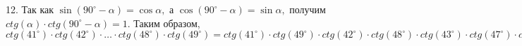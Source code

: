 12. Так как $\sin (90^\circ-\alpha)=\cos \alpha,$ а $\cos (90^\circ-\alpha)=\sin \alpha,$ получим $ctg(\alpha)\cdot ctg(90^\circ-\alpha)=1.$ Таким образом,
$ctg(41^\circ)\cdot ctg(42^\circ)\cdot \ldots \cdot ctg(48^\circ)\cdot ctg(49^\circ)=ctg(41^\circ)\cdot ctg(49^\circ)\cdot
ctg(42^\circ)\cdot ctg(48^\circ)\cdot
ctg(43^\circ)\cdot ctg(47^\circ)\cdot
ctg(44^\circ)\cdot ctg(46^\circ)\cdot ctg(45^\circ)=1.$\\
